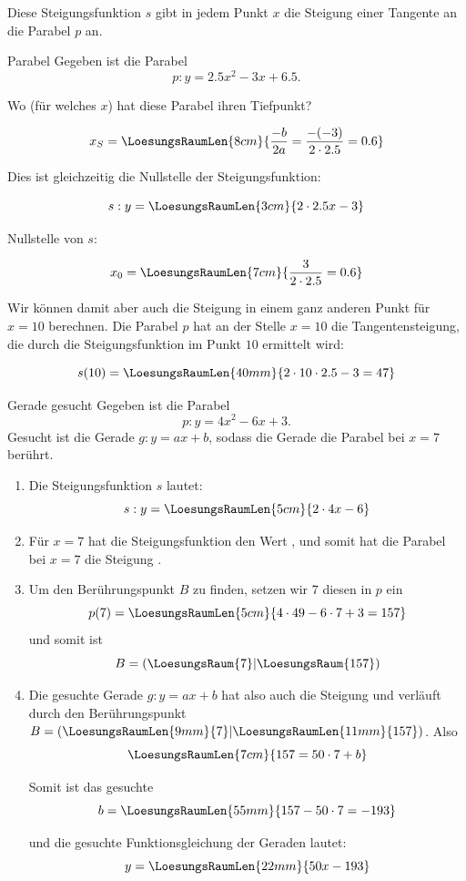 Diese Steigungsfunktion $s$ gibt in jedem Punkt $x$ die Steigung einer
Tangente an die Parabel $p$ an.

\begin{beispiel}{Parabel}{}
  Gegeben ist die Parabel $$p: y=2.5x^2 - 3x + 6.5\text{.}$$

  Wo (für welches $x$) hat diese Parabel
  ihren Tiefpunkt? 

  $$x_S =   \LoesungsRaumLen{8cm}{\frac{-b}{2a} = \frac{-(-3)}{2\cdot{}2.5} = 0.6}$$

  Dies ist gleichzeitig die Nullstelle der
  Steigungsfunktion:

  $$s: y= \LoesungsRaumLen{3cm}{2\cdot{}2.5x - 3}$$

  Nullstelle von $s$:

  $$x_0 = \LoesungsRaumLen{7cm}{\frac{3}{2\cdot{}2.5} = 0.6}$$

  Wir können damit aber auch die Steigung in einem ganz anderen Punkt
  \zB für $x=10$ berechnen. Die Parabel $p$ hat an der Stelle $x=10$
  die Tangentensteigung, die durch die Steigungsfunktion im Punkt $10$
  ermittelt wird:

  $$s(10) = \LoesungsRaumLen{40mm}{2\cdot{}10\cdot{2.5} - 3 = 47}$$
  
\end{beispiel}
\newpage

\begin{beispiel}{Gerade gesucht}{}
Gegeben ist die Parabel $$p: y=4x^2 -6x + 3\text{.}$$ Gesucht ist die Gerade
$g: y=ax+b$, sodass die Gerade die Parabel bei $x=7$ berührt.

\begin{enumerate}
\item Die Steigungsfunktion $s$ lautet: $$s:
  y=\LoesungsRaumLen{5cm}{2\cdot{}4x - 6}$$
  
\item Für $x=7$ hat die Steigungsfunktion den Wert , und somit hat
  die Parabel bei $x=7$ die Steigung .

  
\item Um den Berührungspunkt $B$ zu finden, setzen wir 7 diesen in $p$
  ein
  $$p(7)= \LoesungsRaumLen{5cm}{4\cdot{}49-6\cdot{}7+3 = 157}$$
  und somit ist
  $$B=(\LoesungsRaum{7}|\LoesungsRaum{157})$$
  
\item Die gesuchte Gerade $g: y=ax+b$ hat also auch die Steigung 
  und verläuft durch den Berührungspunkt $B=(\LoesungsRaumLen{9mm}{7}|\LoesungsRaumLen{11mm}{157})$. Also
  $$\LoesungsRaumLen{7cm}{157=50\cdot{}7+b}$$

  Somit ist das gesuchte
  $$b = \LoesungsRaumLen{55mm}{157-50\cdot{}7=-193}$$
  
  und die gesuchte Funktionsgleichung der Geraden lautet: $$y = \LoesungsRaumLen{22mm}{50x-193}$$
  \end{enumerate}
\end{beispiel}

